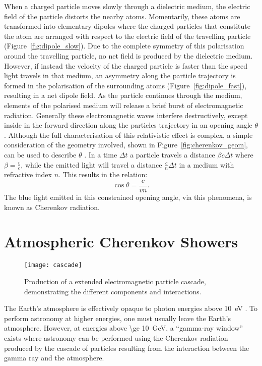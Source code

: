 When a charged particle moves slowly through a dielectric medium, the electric field of the particle distorts the nearby atoms. Momentarily, these atoms are transformed into elementary dipoles where the charged particles that constitute the atom are arranged with respect to the electric field of the travelling particle (Figure~\ref{fig:dipole_slow}). Due to the complete symmetry of this polarisation around the travelling particle, no net field is produced by the dielectric medium. However, if instead the velocity of the charged particle is faster than the speed light travels in that medium, an asymmetry along the particle trajectory is formed in the polarisation of the surrounding atoms (Figure~\ref{fig:dipole_fast}), resulting in a net dipole field. As the particle continues through the medium, elements of the polarised medium will release a brief burst of electromagnetic radiation. Generally these electromagnetic waves interfere destructively, except inside in the forward direction along the particles trajectory in an opening angle $\theta$. Although the full characterisation of this relativistic effect is complex, a simple consideration of the geometry involved, shown in Figure~\ref{fig:cherenkov_geom}, can be used to describe $\theta$ \cite{Jelley1958a}. In a time $\Delta t$ a particle travels a distance $\beta c \Delta t$ where $\beta = \frac{v}{c}$, while the emitted light will travel a distance $\frac{c}{n} \Delta t$ in a medium with refractive index $n$. This results in the relation:
\begin{equation} \label{eq:cherenkov_angle}
\cos \theta = \frac{c}{vn}.
\end{equation}
The blue light emitted in this constrained opening angle, via this phenomena, is known as Cherenkov radiation.

\section{Atmospheric Cherenkov Showers}

\begin{figure}
	\centering\texttt{[image: cascade]} 
	\caption[Production of a extended electromagnetic particle cascade.]{Production of a extended electromagnetic particle cascade, demonstrating the different components and interactions.}
	\label{fig:cascade}
\end{figure}

The Earth's atmosphere is effectively opaque to photon energies above \SI{10}{eV} \cite{Weekes2003}. To perform astronomy at higher energies, one must usually leave the Earth's atmosphere. However, at energies above \SI{\ge 10}{GeV}, a ``gamma-ray window'' exists where astronomy can be performed using the Cherenkov radiation produced by the cascade of particles resulting from the interaction between the gamma ray and the atmosphere.

